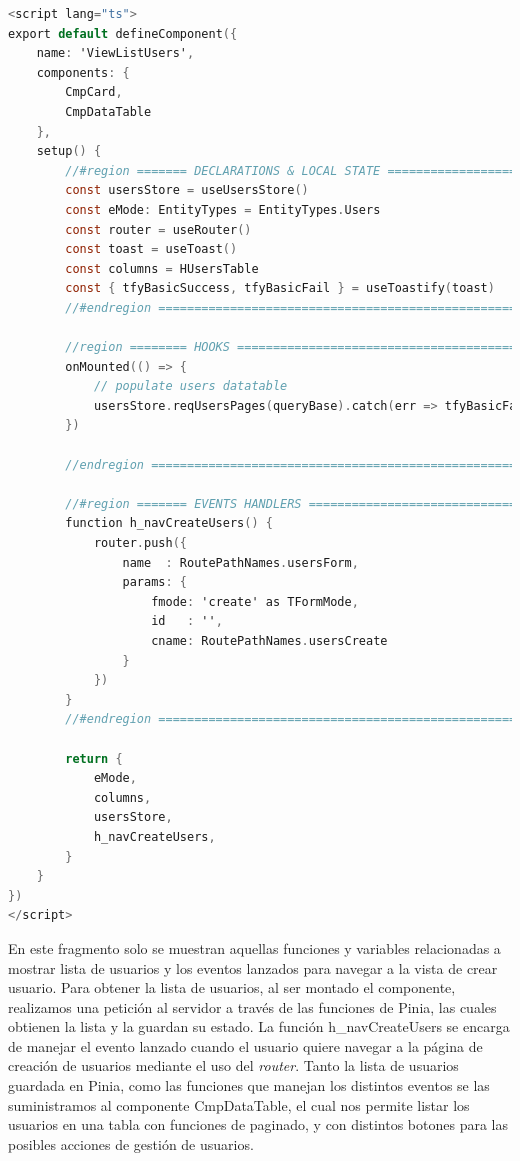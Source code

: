 \begin{lstlisting}[language=C,caption={Sección <script> de VueListUsers.vue}, label={lst:viewlist}]
<script lang="ts">
export default defineComponent({
    name: 'ViewListUsers',
    components: {
        CmpCard,
        CmpDataTable
    },
    setup() {
        //#region ======= DECLARATIONS & LOCAL STATE ==========================================
        const usersStore = useUsersStore()
        const eMode: EntityTypes = EntityTypes.Users
        const router = useRouter()
        const toast = useToast()
        const columns = HUsersTable
        const { tfyBasicSuccess, tfyBasicFail } = useToastify(toast)
        //#endregion ===========================================================

        //region ======== HOOKS ================================================
        onMounted(() => {
            // populate users datatable
            usersStore.reqUsersPages(queryBase).catch(err => tfyBasicFail(err, 'Users', 'request'))
        })

        //endregion ============================================================
        
        //#region ======= EVENTS HANDLERS ======================================
        function h_navCreateUsers() {
            router.push({
                name  : RoutePathNames.usersForm,
                params: {
                    fmode: 'create' as TFormMode,
                    id   : '',
                    cname: RoutePathNames.usersCreate 
                }
            })
        }
        //#endregion =========================================================

        return {
            eMode,
            columns,
            usersStore,
            h_navCreateUsers,
        }
    }
})
</script>
\end{lstlisting}

En este fragmento solo se muestran aquellas funciones y variables relacionadas a mostrar lista de usuarios y los eventos lanzados para navegar a la vista de crear usuario. Para obtener la lista de usuarios, al ser montado el componente, realizamos una petición al servidor a través de las funciones de Pinia, las cuales obtienen la lista y la guardan su estado. La función h\_navCreateUsers se encarga de manejar el evento lanzado cuando el usuario quiere navegar a la página de creación de usuarios mediante el uso del \textit{router}. Tanto la lista de usuarios guardada en Pinia, como las funciones que manejan los distintos eventos se las suministramos al componente CmpDataTable, el cual nos permite listar los usuarios en una tabla con funciones de paginado, y con distintos botones para las posibles acciones de gestión de usuarios.


